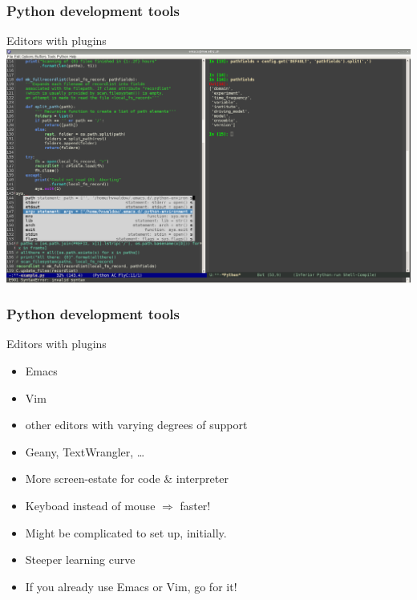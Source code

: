 \documentclass[xcolor=pdftex,dvipsnames,table]{beamer}
\begin{document}
\begin{frame}
  \frametitle{Python development tools}
  \begin{block}{Editors with plugins}
    \includegraphics[width=\textwidth]{emacs.png}
  \end{block}
\end{frame}

\begin{frame}
  \frametitle{Python development tools}
  \begin{block}{Editors with plugins}
    \begin{itemize}
    \item<1-> Emacs
    \item<1-> Vim
    \item<1-> other editors with varying degrees of support
    \item<1-> Geany, TextWrangler, \ldots
    \item<2-> More screen-estate for code \& interpreter
    \item<2-> Keyboad instead of mouse $\Rightarrow$ faster!
    \item<2-> Might be complicated to set up, initially.
    \item<2-> Steeper learning curve
    \item<3-> \alert{If you already use Emacs or Vim, go for it!}
    \end{itemize}
  \end{block}
\end{frame}
\end{document}
